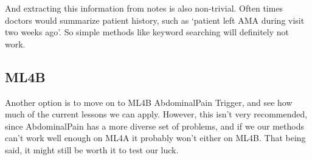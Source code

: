 \documentclass[12pt]{article}
\theoremstyle{definition}
\begin{document}
And extracting this information from notes is also non-trivial. Often times doctors would summarize patient history, such as `patient left AMA during visit two weeks ago'. So simple methods like keyword searching will definitely not work.

\subsection{ML4B}
Another option is to move on to ML4B AbdominalPain Trigger, and see how much of the current lessons we can apply. However, this isn't very recommended, since AbdominalPain has a more diverse set of problems, and if we our methods can't work well enough on ML4A it probably won't either on ML4B. That being said, it might still be worth it to test our luck.
\end{document}
